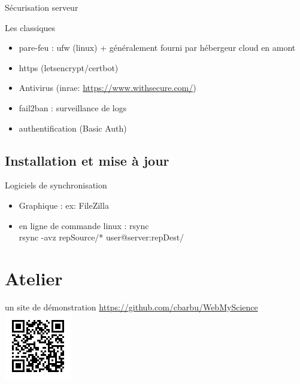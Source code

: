 \documentclass[pdftex,xcolor={table}]{beamer} %
\begin{document}
  \begin{frame}{Sécurisation serveur}
    \begin{block}{Les classiques}
      \begin{itemize}
        \item pare-feu : ufw (linux) + généralement fourni par hébergeur cloud en amont
        \item https (letsencrypt/certbot)
        \item Antivirus (inrae: \url{https://www.withsecure.com/})
        \item fail2ban : surveillance de logs
        \item authentification (Basic Auth)
      \end{itemize}
    \end{block}
  \end{frame}

\subsection{Installation et mise à jour}
     \begin{frame}{Logiciels de synchronisation}
       \begin{itemize}
         \item Graphique : ex: FileZilla
         \item en ligne de commande linux : rsync \\
             rsync -avz repSource/* user@server:repDest/
       \end{itemize}
    \end{frame}

\section{Atelier}
  \begin{frame}{un site de démonstration}
    \url{https://github.com/cbarbu/WebMyScience}
    \includegraphics[scale=1]{webmyscience.png} \\
  \end{frame}
  
\end{document}
